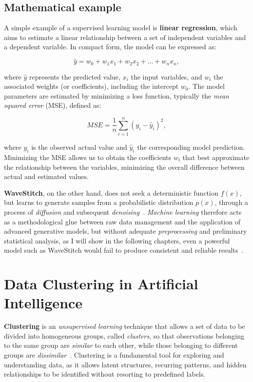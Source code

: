 \subsection{Mathematical example}

A simple example of a supervised learning model is \textbf{linear regression}, which aims to estimate a linear relationship between a set of independent variables and a dependent variable.  
In compact form, the model can be expressed as:

\[
\hat{y} = w_0 + w_1 x_1 + w_2 x_2 + \dots + w_n x_n,
\]

where \( \hat{y} \) represents the predicted value, \( x_i \) the input variables, and \( w_i \) the associated weights (or coefficients), including the intercept \( w_0 \).  
The model parameters are estimated by minimizing a loss function, typically the \emph{mean squared error} (MSE), defined as:

\[
MSE = \frac{1}{n} \sum_{i=1}^{n} (y_i - \hat{y}_i)^2,
\]

where \( y_i \) is the observed actual value and \( \hat{y}_i \) the corresponding model prediction.  
Minimizing the MSE allows us to obtain the coefficients \( w_i \) that best approximate the relationship between the variables, minimizing the overall difference between actual and estimated values.

\medskip

\noindent
\textbf{WaveStitch}, on the other hand, does not seek a deterministic function \( f(x) \), but learns to generate samples from a probabilistic distribution \( p(x) \), through a process of \emph{diffusion} and subsequent \emph{denoising}~\cite{wavestitch}.  
\emph{Machine learning} therefore acts as a methodological glue between raw data management and the application of advanced generative models, but without adequate \emph{preprocessing} and preliminary statistical analysis, as I will show in the following chapters, even a powerful model such as WaveStitch would fail to produce consistent and reliable results~\cite{bishop2006pattern,hastie2009elements}.

\section{Data Clustering in Artificial Intelligence}

\textbf{Clustering} is an \emph{unsupervised learning} technique that allows a set of data to be divided into homogeneous groups, called \emph{clusters}, so that observations belonging to the same group are \emph{similar} to each other, while those belonging to different groups are \emph{dissimilar}~\cite{jain2010data}.  
Clustering is a fundamental tool for exploring and understanding data, as it allows latent structures, recurring patterns, and hidden relationships to be identified without resorting to predefined labels.

